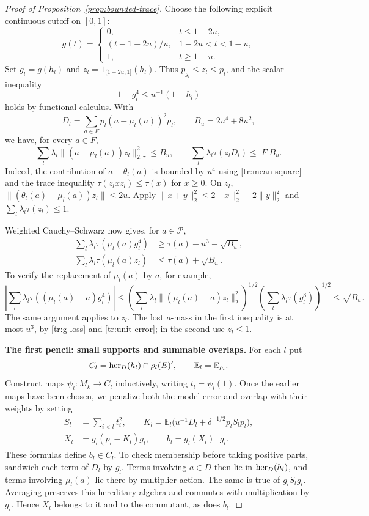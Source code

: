 \begin{proof}[Proof of Proposition~\ref{prop:bounded-trace}]
Choose the following explicit continuous cutoff on $[0,1]$:
\[
 g(t)=\begin{cases}
 0,&t\leq1-2u,\\
 (t-1+2u)/u,&1-2u<t<1-u,\\
 1,&t\geq1-u.
 \end{cases}
\]
Set $g_l=g(h_l)$ and $z_l=1_{(1-2u,1]}(h_l)$.  Thus
$p_{g_l}\leq z_l\leq p_l$, and the scalar inequality
\begin{equation}\label{tr:g-loss}
 1-g_l^4\leq u^{-1}(1-h_l)
\end{equation}
holds by functional calculus.  With
\[
 D_l=\sum_{a\in F}p_l(a-\mu_l(a))^2p_l,\qquad
 B_u=2u^4+8u^2,
\]
we have, for every $a\in F$,
\begin{equation}\label{tr:model-square}
 \sum_l\lambda_l\|(a-\mu_l(a))z_l\|_{2,\tau}^2\leq B_u,
 \qquad
 \sum_l\lambda_l\tau(z_lD_l)\leq |F|B_u.
\end{equation}
Indeed, the contribution of $a-\theta_l(a)$ is bounded by $u^4$
using \eqref{tr:mean-square} and the trace inequality
$\tau(z_lxz_l)\leq\tau(x)$ for $x\geq0$.  On $z_l$,
$\|(\theta_l(a)-\mu_l(a))z_l\|\leq2u$.
Apply $\|x+y\|_2^2\leq2\|x\|_2^2+2\|y\|_2^2$ and
$\sum_l\lambda_l\tau(z_l)\leq1$.

Weighted Cauchy--Schwarz now gives, for $a\in\mathcal P$,
\begin{align}
 \sum_l\lambda_l\tau(\mu_l(a)g_l^4)
 &\geq\tau(a)-u^3-\sqrt{B_u},\label{tr:T1-lower}\\
 \sum_l\lambda_l\tau(\mu_l(a)z_l)
 &\leq\tau(a)+\sqrt{B_u}.\label{tr:T1-upper}
\end{align}
To verify the replacement of $\mu_l(a)$ by $a$, for example,
\[
 \left|\sum_l\lambda_l\tau((\mu_l(a)-a)g_l^4)\right|
 \leq
 \left(\sum_l\lambda_l\|(\mu_l(a)-a)z_l\|_2^2\right)^{1/2}
 \left(\sum_l\lambda_l\tau(g_l^8)\right)^{1/2}
 \leq\sqrt{B_u}.
\]
The same argument applies to $z_l$.  The lost $a$-mass in the first
inequality is at most $u^3$, by \eqref{tr:g-loss} and
\eqref{tr:unit-error}; in the second use $z_l\leq1$.

\medskip\noindent
\textbf{The first pencil: small supports and summable overlaps.}
For each $l$ put
\[
 C_l=\operatorname{her}_D(h_l)\cap\rho_l(E)',\qquad
 \mathbb E_l=\mathbb E_{\rho_l}.
\]
Construct maps $\psi_l:M_k\to C_l$ inductively, writing
$t_l=\psi_l(1)$. Once the earlier maps have been chosen, we penalize
both the model error and overlap with their weights by setting
\begin{align}
 S_l&=\sum_{i<l}t_i^2,\qquad
 K_l=\mathbb E_l\big(u^{-1}D_l+\delta^{-1/2}p_lS_lp_l\big),\nonumber\\
 X_l&=g_l(p_l-K_l)g_l,\qquad
 b_l=g_l(X_l)_+g_l.\label{tr:first-pencil}
\end{align}
These formulas define $b_l\in C_l$.  To check membership before taking
positive parts, sandwich each term of $D_l$ by $g_l$.  Terms involving
$a\in D$ then lie in $\operatorname{her}_D(h_l)$, and terms involving $\mu_l(a)$ lie
there by multiplier action.  The same is true of $g_lS_lg_l$.
Averaging preserves this hereditary algebra and commutes with
multiplication by $g_l$.  Hence $X_l$ belongs to it and to the
commutant, as does $b_l$.


\end{proof}
